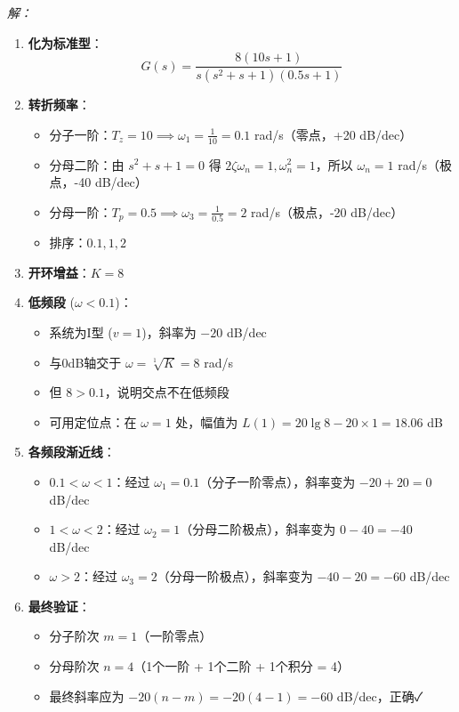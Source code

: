 \textit{解：}
\begin{enumerate}
    \item \textbf{化为标准型}：
    \[G(s) = \frac{8(10s+1)}{s(s^2+s+1)(0.5s+1)}\]
    
    \item \textbf{转折频率}：
    \begin{itemize}
        \item 分子一阶：$T_z=10 \implies \omega_1 = \frac{1}{10} = 0.1$ rad/s（零点，+20 dB/dec）
        \item 分母二阶：由 $s^2+s+1 = 0$ 得 $2\zeta\omega_n = 1, \omega_n^2 = 1$，所以 $\omega_n=1$ rad/s（极点，-40 dB/dec）
        \item 分母一阶：$T_p=0.5 \implies \omega_3 = \frac{1}{0.5} = 2$ rad/s（极点，-20 dB/dec）
        \item 排序：$0.1, 1, 2$
    \end{itemize}
    
    \item \textbf{开环增益}：$K = 8$
    
    \item \textbf{低频段} ($\omega < 0.1$)：
    \begin{itemize}
        \item 系统为I型 ($v=1$)，斜率为 $-20$ dB/dec
        \item 与0dB轴交于 $\omega = \sqrt[1]{K} = 8$ rad/s
        \item 但 $8 > 0.1$，说明交点不在低频段
        \item 可用定位点：在 $\omega=1$ 处，幅值为 $L(1) = 20\lg 8 - 20 \times 1 = 18.06$ dB
    \end{itemize}
    
    \item \textbf{各频段渐近线}：
    \begin{itemize}
        \item $0.1 < \omega < 1$：经过 $\omega_1=0.1$（分子一阶零点），斜率变为 $-20+20=0$ dB/dec
        \item $1 < \omega < 2$：经过 $\omega_2=1$（分母二阶极点），斜率变为 $0-40=-40$ dB/dec
        \item $\omega > 2$：经过 $\omega_3=2$（分母一阶极点），斜率变为 $-40-20=-60$ dB/dec
    \end{itemize}
    
    \item \textbf{最终验证}：
    \begin{itemize}
        \item 分子阶次 $m=1$（一阶零点）
        \item 分母阶次 $n=4$（1个一阶 + 1个二阶 + 1个积分 = 4）
        \item 最终斜率应为 $-20(n-m) = -20(4-1) = -60$ dB/dec，正确✓
    \end{itemize}
\end{enumerate}

